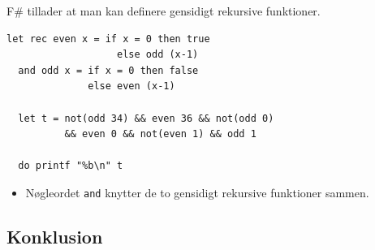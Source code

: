 \documentclass[rgb]{beamer}
\begin{document}
\begin{frame}[fragile]
\begin{footnotesize}


  \vspace{1ex}

  F\# tillader at man kan definere gensidigt rekursive funktioner.


  \vspace{1ex}

\begin{lstlisting}[numbers=none,frame=none,mathescape]
  let rec even x = if x = 0 then true
                   else odd (x-1)
  and odd x = if x = 0 then false
              else even (x-1)

  let t = not(odd 34) && even 36 && not(odd 0)
          && even 0 && not(even 1) && odd 1

  do printf "%b\n" t
\end{lstlisting}

\begin{itemize}
\item Nøgleordet \lstinline{and} knytter de to gensidigt rekursive funktioner sammen.
\end{itemize}

\end{footnotesize}
\end{frame}

\subsection*{Konklusion}
\begin{frame}[fragile]

  \vspace{3mm}
  \tableofcontents
\end{frame}
\end{document}
